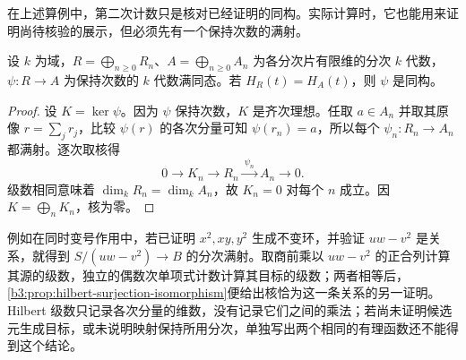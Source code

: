 \ProseParagraphBreak
在上述算例中，第二次计数只是核对已经证明的同构。实际计算时，它也能用来证明尚待核验的展示，但必须先有一个保持次数的满射。

\begin{proposition}\label{b3:prop:hilbert-surjection-isomorphism}
	设 \(k\) 为域，\(R=\bigoplus_{n\ge0}R_n\)、\(A=\bigoplus_{n\ge0}A_n\) 为各分次片有限维的分次 \(k\) 代数，\(\psi:R\to A\) 为保持次数的 \(k\) 代数满同态。若 \(H_R(t)=H_A(t)\)，则 \(\psi\) 是同构。
\end{proposition}
\begin{proof}
	设 \(K=\ker\psi\)。因为 \(\psi\) 保持次数，\(K\) 是齐次理想。任取 \(a\in A_n\) 并取其原像 \(r=\sum_jr_j\)，比较 \(\psi(r)\) 的各次分量可知 \(\psi(r_n)=a\)，所以每个 \(\psi_n:R_n\to A_n\) 都满射。逐次取核得
	\[
		0\longrightarrow K_n\longrightarrow R_n \xrightarrow{\ \psi_n\ }A_n\longrightarrow0.
	\]
	级数相同意味着 \(\dim_kR_n=\dim_kA_n\)，故 \(K_n=0\) 对每个 \(n\) 成立。因 \(K=\bigoplus_nK_n\)，核为零。
\end{proof}

例如在同时变号作用中，若已证明 \(x^2,xy,y^2\) 生成不变环，并验证 \(uw-v^2\) 是关系，就得到 \(S/(uw-v^2)\to B\) 的分次满射。取商前乘以 \(uw-v^2\) 的正合列计算其源的级数，独立的偶数次单项式计数计算其目标的级数；两者相等后，\cref{b3:prop:hilbert-surjection-isomorphism}便给出核恰为这一条关系的另一证明。Hilbert 级数只记录各次分量的维数，没有记录它们之间的乘法；若尚未证明候选元生成目标，或未说明映射保持所用分次，单独写出两个相同的有理函数还不能得到这个结论。
